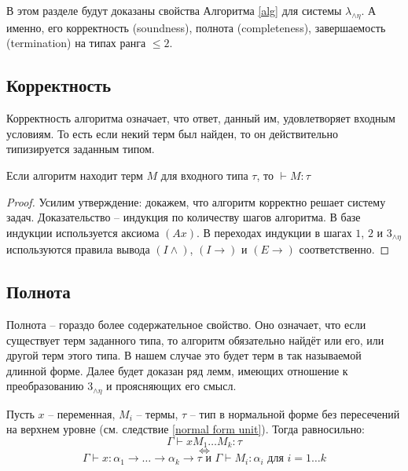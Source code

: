 \documentclass[../main.tex]{subfiles}
\begin{document}
 \label{sec:properties}



В этом разделе будут доказаны свойства Алгоритма \ref{alg} для системы $\lambda_{\wedge \eta}$. А именно, его корректность (soundness), полнота (completeness), завершаемость (termination) на типах ранга $\leqslant 2$.


\subsection{Корректность}

Корректность алгоритма означает, что ответ, данный им, удовлетворяет входным условиям. То есть если некий терм был найден, то он действительно типизируется заданным типом.

\begin{theorem}[Soundness] \label{soundness}
Если алгоритм находит терм $M$ для входного типа $\tau$, то $\vdash M \colon \tau$
\end{theorem}
\begin{proof}
Усилим утверждение: докажем, что алгоритм корректно решает систему задач. Доказательство -- индукция по количеству шагов алгоритма. В базе индукции используется аксиома $(Ax)$. В переходах индукции в шагах $1$, $2$ и $3_{\wedge \eta}$ используются правила вывода $(I \wedge)$, $(I \to)$ и $(E \to)$ соответственно.
\end{proof}

\subsection{Полнота}

Полнота -- гораздо более содержательное свойство. Оно означает, что если существует терм заданного типа, то алгоритм обязательно найдёт или его, или другой терм этого типа. В нашем случае это будет терм в так называемой длинной форме.
Далее будет доказан ряд лемм, имеющих отношение к преобразованию $3_{\wedge \eta}$ и проясняющих его смысл. 

\begin{lemma} \label{необходимая типизация}

Пусть $x$ -- переменная, $M_i$ -- термы, $\tau$ -- тип в нормальной форме без пересечений на верхнем уровне (см. следствие \ref{normal form unit}). Тогда равносильно: 
    $$\Gamma \vdash x M_1 \dots M_k \colon \tau$$ 
    $$\iff$$
    $$\Gamma \vdash x \colon \alpha_1 \to \dots \to \alpha_k \to \tau \text{ и } \Gamma \vdash M_i \colon \alpha_i \text{ для } i = 1 \dots k$$
\end{lemma}
\end{document}
